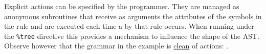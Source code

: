 Explicit actions can be specified by the programmer. 
They are managed as anonymous subroutines
that receive as arguments the attributes of the symbols
in the rule and are executed each time a 
by that rule occurs. When running under the \verb|%tree| directive
this provides a mechanism to influence the shape of the AST.
Observe however that the grammar in the example is \underline{clean} of actions:
.
